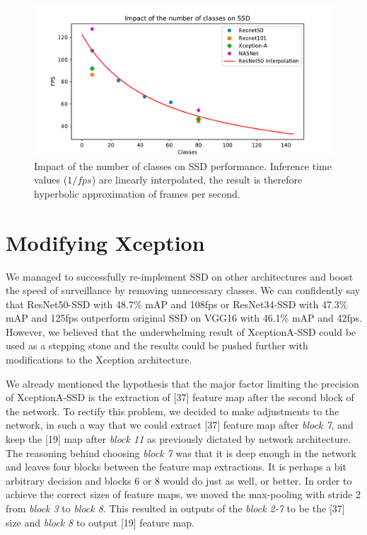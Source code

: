 \begin{figure}
    \centering
    \includegraphics[width=\textwidth]{img/fps_cls}
    \caption[Impact of the number of classes on SSD performance]{Impact of the number of classes on SSD performance. Inference time values ($1/fps$) are linearly interpolated, the result is therefore hyperbolic approximation of frames per second.}
    \label{fig:fpscls}
\end{figure}


\section{Modifying Xception}
\label{sec:fixxception}
We managed to successfully re-implement SSD on other architectures and boost the speed of surveillance by removing unnecessary classes. We can confidently say that ResNet50-SSD with 48.7\% mAP and 108fps or ResNet34-SSD with 47.3\% mAP and 125fps outperform original SSD on VGG16 with 46.1\% mAP and 42fps. However, we believed that the underwhelming result of XceptionA-SSD could be used as a stepping stone and the results could be pushed further with modifications to the Xception architecture. 

We already mentioned the hypothesis that the major factor limiting the precision of XceptionA-SSD is the extraction of [37] feature map after the second block of the network. To rectify this problem, we decided to make adjustments to the network, in such a way that we could extract [37] feature map after \textit{block 7}, and keep the [19] map after \textit{block 11} as previously dictated by network architecture. The reasoning behind choosing \textit{block 7} was that it is deep enough in the network and leaves four blocks between the feature map extractions. It is perhaps a bit arbitrary decision and blocks 6 or 8 would do just as well, or better.  In order to achieve the correct sizes of feature maps, we moved the max-pooling with stride 2 from \textit{block 3} to \textit{block 8}. This resulted in outputs of the \textit{block 2-7} to be the [37] size and \textit{block 8} to output [19] feature map. 

